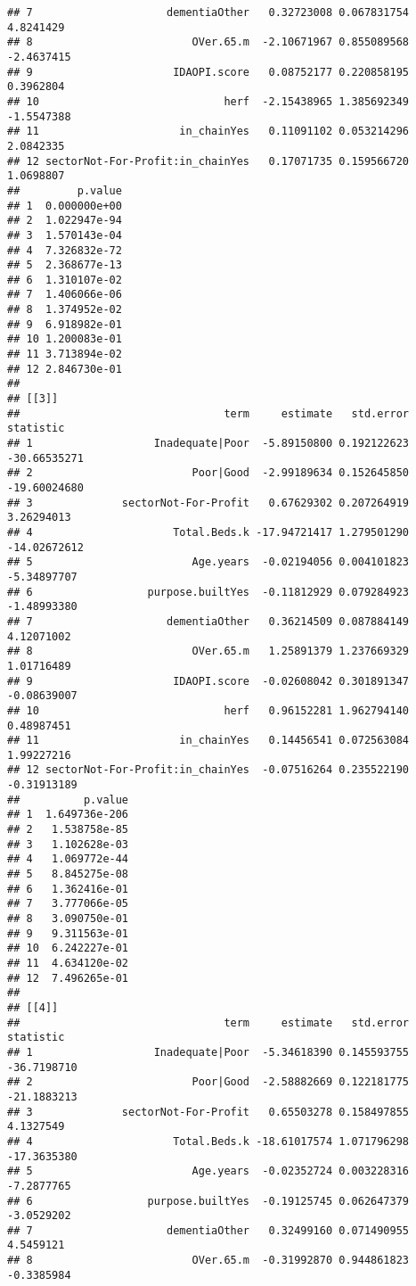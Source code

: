 \documentclass[]{article}
\begin{document}
\begin{verbatim}
## 7                     dementiaOther   0.32723008 0.067831754   4.8241429
## 8                         OVer.65.m  -2.10671967 0.855089568  -2.4637415
## 9                      IDAOPI.score   0.08752177 0.220858195   0.3962804
## 10                             herf  -2.15438965 1.385692349  -1.5547388
## 11                      in_chainYes   0.11091102 0.053214296   2.0842335
## 12 sectorNot-For-Profit:in_chainYes   0.17071735 0.159566720   1.0698807
##         p.value
## 1  0.000000e+00
## 2  1.022947e-94
## 3  1.570143e-04
## 4  7.326832e-72
## 5  2.368677e-13
## 6  1.310107e-02
## 7  1.406066e-06
## 8  1.374952e-02
## 9  6.918982e-01
## 10 1.200083e-01
## 11 3.713894e-02
## 12 2.846730e-01
## 
## [[3]]
##                                term     estimate   std.error    statistic
## 1                   Inadequate|Poor  -5.89150800 0.192122623 -30.66535271
## 2                         Poor|Good  -2.99189634 0.152645850 -19.60024680
## 3              sectorNot-For-Profit   0.67629302 0.207264919   3.26294013
## 4                      Total.Beds.k -17.94721417 1.279501290 -14.02672612
## 5                         Age.years  -0.02194056 0.004101823  -5.34897707
## 6                  purpose.builtYes  -0.11812929 0.079284923  -1.48993380
## 7                     dementiaOther   0.36214509 0.087884149   4.12071002
## 8                         OVer.65.m   1.25891379 1.237669329   1.01716489
## 9                      IDAOPI.score  -0.02608042 0.301891347  -0.08639007
## 10                             herf   0.96152281 1.962794140   0.48987451
## 11                      in_chainYes   0.14456541 0.072563084   1.99227216
## 12 sectorNot-For-Profit:in_chainYes  -0.07516264 0.235522190  -0.31913189
##          p.value
## 1  1.649736e-206
## 2   1.538758e-85
## 3   1.102628e-03
## 4   1.069772e-44
## 5   8.845275e-08
## 6   1.362416e-01
## 7   3.777066e-05
## 8   3.090750e-01
## 9   9.311563e-01
## 10  6.242227e-01
## 11  4.634120e-02
## 12  7.496265e-01
## 
## [[4]]
##                                term     estimate   std.error   statistic
## 1                   Inadequate|Poor  -5.34618390 0.145593755 -36.7198710
## 2                         Poor|Good  -2.58882669 0.122181775 -21.1883213
## 3              sectorNot-For-Profit   0.65503278 0.158497855   4.1327549
## 4                      Total.Beds.k -18.61017574 1.071796298 -17.3635380
## 5                         Age.years  -0.02352724 0.003228316  -7.2877765
## 6                  purpose.builtYes  -0.19125745 0.062647379  -3.0529202
## 7                     dementiaOther   0.32499160 0.071490955   4.5459121
## 8                         OVer.65.m  -0.31992870 0.944861823  -0.3385984

\end{verbatim}
\end{document}
